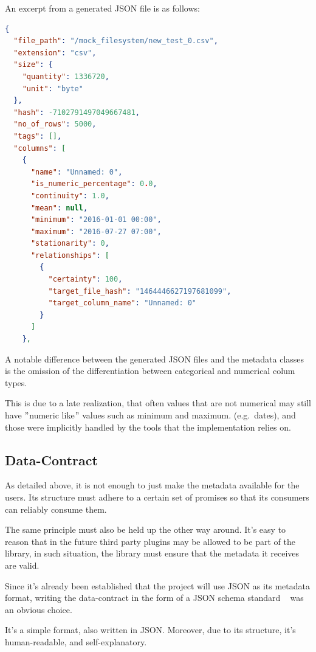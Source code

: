 \newline
\newline

An excerpt from a generated JSON file is as follows:
\begin{lstlisting}[language=json,firstnumber=1]
{
  "file_path": "/mock_filesystem/new_test_0.csv",
  "extension": "csv",
  "size": {
    "quantity": 1336720,
    "unit": "byte"
  },
  "hash": -7102791497049667481,
  "no_of_rows": 5000,
  "tags": [],
  "columns": [
    {
      "name": "Unnamed: 0",
      "is_numeric_percentage": 0.0,
      "continuity": 1.0,
      "mean": null,
      "minimum": "2016-01-01 00:00",
      "maximum": "2016-07-27 07:00",
      "stationarity": 0,
      "relationships": [
        {
          "certainty": 100,
          "target_file_hash": "1464446627197681099",
          "target_column_name": "Unnamed: 0"
        }
      ]
    },
\end{lstlisting}

A notable difference between the generated JSON files and the metadata classes is the
omission of the differentiation between categorical and numerical colum types.

This is due to a late realization, that often values that are not numerical may still have
\("\)numeric like\("\) values such as minimum and maximum. (e.g.\ dates), and those
were implicitly handled by the tools that the implementation relies on.

\subsection{Data-Contract}
As detailed above, it is not enough to just make the metadata available for the users.
Its structure must adhere to a certain set of promises so that its consumers can reliably consume them.

The same principle must also be held up the other way around.
It's easy to reason that in the future third party plugins may be allowed to be part of
the library, in such situation, the library must ensure that the metadata it receives are valid.

Since it's already been established that the project will use JSON as its metadata format,
writing the data-contract in the form of a JSON schema standard ~\cite{jsonschema} was an obvious choice.

It's a simple format, also written in JSON. Moreover, due to its structure, it's human-readable, and self-explanatory.

